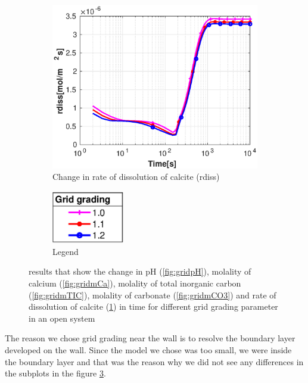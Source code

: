 \begin{figure}[!h]
        \hfill
        \begin{subfigure}{.5\linewidth}
            \centering
        \includegraphics[width=\textwidth]{PICTURES/with_grid_rdiss.eps}
        \caption{Change in rate of dissolution of calcite (rdiss)}
        \label{fig:gridrdiss}
    \end{subfigure}%
        \hfill
        \begin{subfigure}{.5\linewidth}
            \centering
        \includegraphics[width=0.35\textwidth]{PICTURES/with_grid_legend.eps}
        \caption{Legend}
        \label{fig:gridlegend}
    \end{subfigure}%
    \caption{\DuMuX results that show the change in pH (\cref{fig:gridpH}), molality of calcium (\cref{fig:gridmCa}), molality of total inorganic carbon (\cref{fig:gridmTIC}), molality of carbonate (\cref{fig:gridmCO3}) and rate of dissolution of calcite (\cref{fig:gridrdiss}) in time for different grid grading parameter in an open system}
    \label{fig:diffGrid}
\end{figure}

The reason we chose grid grading near the wall is to resolve the boundary layer developed on the wall. Since the model we chose was too small, we were inside the boundary layer and that was the reason why we did not see any differences in the subplots in the figure \ref{fig:diffGrid}.

